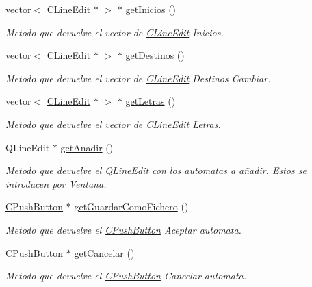 \begin{DoxyCompactItemize}
vector$<$ \hyperlink{classCLineEdit}{C\+Line\+Edit} $\ast$ $>$ $\ast$ \hyperlink{classCAsistenteCodificacion_a6e18515302506ef6766a5a4bdbb64dfd}{get\+Inicios} ()
\begin{DoxyCompactList}\small\item\em Metodo que devuelve el vector de \hyperlink{classCLineEdit}{C\+Line\+Edit} Inicios. \end{DoxyCompactList}\item 
vector$<$ \hyperlink{classCLineEdit}{C\+Line\+Edit} $\ast$ $>$ $\ast$ \hyperlink{classCAsistenteCodificacion_a8e55263b52df54df6353f6a2ae4a88df}{get\+Destinos} ()
\begin{DoxyCompactList}\small\item\em Metodo que devuelve el vector de \hyperlink{classCLineEdit}{C\+Line\+Edit} Destinos Cambiar. \end{DoxyCompactList}\item 
vector$<$ \hyperlink{classCLineEdit}{C\+Line\+Edit} $\ast$ $>$ $\ast$ \hyperlink{classCAsistenteCodificacion_ae4e5d1b2a9830a026897bed772bfb49e}{get\+Letras} ()
\begin{DoxyCompactList}\small\item\em Metodo que devuelve el vector de \hyperlink{classCLineEdit}{C\+Line\+Edit} Letras. \end{DoxyCompactList}\item 
Q\+Line\+Edit $\ast$ \hyperlink{classCAsistenteCodificacion_a7714a288c08739425ed8cd4d927451e6}{get\+Anadir} ()
\begin{DoxyCompactList}\small\item\em Metodo que devuelve el Q\+Line\+Edit con los automatas a añadir. Estos se introducen por Ventana. \end{DoxyCompactList}\item 
\hyperlink{classCPushButton}{C\+Push\+Button} $\ast$ \hyperlink{classCAsistenteCodificacion_add7a4598c4e7099600d86679af61c138}{get\+Guardar\+Como\+Fichero} ()
\begin{DoxyCompactList}\small\item\em Metodo que devuelve el \hyperlink{classCPushButton}{C\+Push\+Button} Aceptar automata. \end{DoxyCompactList}\item 
\hyperlink{classCPushButton}{C\+Push\+Button} $\ast$ \hyperlink{classCAsistenteCodificacion_a4e1025d9e7c189d22a19d97474499ceb}{get\+Cancelar} ()
\begin{DoxyCompactList}\small\item\em Metodo que devuelve el \hyperlink{classCPushButton}{C\+Push\+Button} Cancelar automata. \end{DoxyCompactList}\item 

\end{DoxyCompactItemize}
